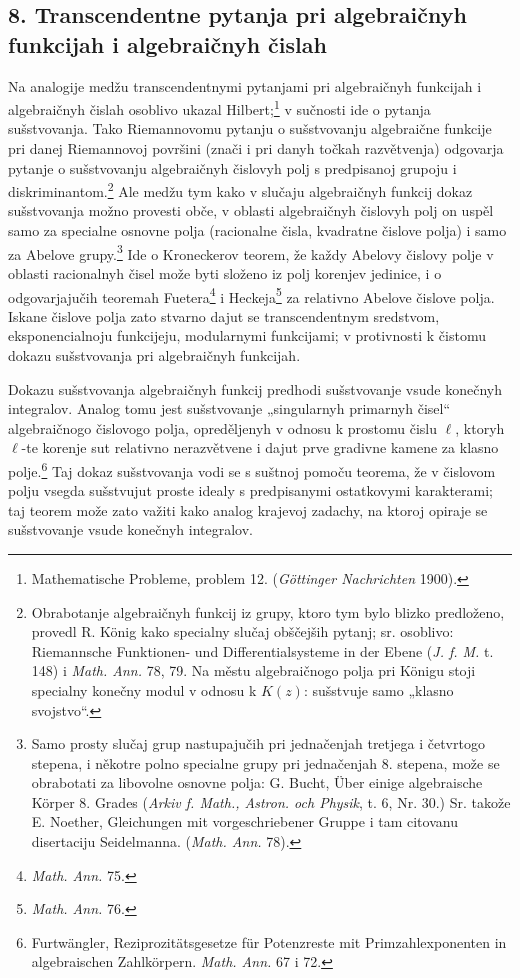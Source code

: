 \documentclass[11pt]{article}
\begin{document}
\subsection*{8. Transcendentne pytanja pri algebraičnyh funkcijah i algebraičnyh čislah}
Na analogije medžu transcendentnymi pytanjami pri algebraičnyh funkcijah i algebraičnyh čislah osoblivo ukazal Hilbert;\footnote{Mathematische Probleme, problem 12. (\emph{Göttinger Nachrichten} 1900).} v sučnosti ide o pytanja sušstvovanja. Tako Riemannovomu pytanju o sušstvovanju algebraične funkcije pri danej Riemannovoj površini (znači i pri danyh točkah razvětvenja) odgovarja pytanje o sušstvovanju algebraičnyh čislovyh polj s predpisanoj grupoju i diskriminantom.\footnote{Obrabotanje algebraičnyh funkcij iz grupy, ktoro tym bylo blizko predloženo, provedl R. König kako specialny slučaj obščejših pytanj; sr. osoblivo: Riemannsche Funktionen- und Differentialsysteme in der Ebene (\emph{J. f. M.} t. 148) i \emph{Math. Ann.} 78, 79. Na městu algebraičnogo polja pri Königu stoji specialny konečny modul v odnosu k \(K(z)\): sušstvuje samo „klasno svojstvo“.} Ale medžu tym kako v slučaju algebraičnyh funkcij dokaz sušstvovanja možno provesti obče, v oblasti algebraičnyh čislovyh polj on uspěl samo za specialne osnovne polja (racionalne čisla, kvadratne čislove polja) i samo za Abelove grupy.\footnote{Samo prosty slučaj grup nastupajučih pri jednačenjah tretjega i četvrtogo stepena, i někotre polno specialne grupy pri jednačenjah 8. stepena, može se obrabotati za libovolne osnovne polja: G. Bucht, Über einige algebraische Körper 8. Grades (\emph{Arkiv f. Math., Astron. och Physik}, t. 6, Nr. 30.) Sr. takože E. Noether, Gleichungen mit vorgeschriebener Gruppe i tam citovanu disertaciju Seidelmanna. (\emph{Math. Ann.} 78).} Ide o Kroneckerov teorem, že každy Abelovy čislovy polje v oblasti racionalnyh čisel može byti složeno iz polj korenjev jedinice, i o odgovarjajučih teoremah Fuetera\footnote{\emph{Math. Ann.} 75.} i Heckeja\footnote{\emph{Math. Ann.} 76.} za relativno Abelove čislove polja. Iskane čislove polja zato stvarno dajut se transcendentnym sredstvom, eksponencialnoju funkcijeju, modularnymi funkcijami; v protivnosti k čistomu dokazu sušstvovanja pri algebraičnyh funkcijah.

Dokazu sušstvovanja algebraičnyh funkcij predhodi sušstvovanje vsude konečnyh integralov. Analog tomu jest sušstvovanje „singularnyh primarnyh čisel“ algebraičnogo čislovogo polja, opreděljenyh v odnosu k prostomu čislu \(\ell\), ktoryh \(\ell\)-te korenje sut relativno nerazvětvene i dajut prve gradivne kamene za klasno polje.\footnote{Furtwängler, Reziprozitätsgesetze für Potenzreste mit Primzahlexponenten in algebraischen Zahlkörpern. \emph{Math. Ann.} 67 i 72.} Taj dokaz sušstvovanja vodi se s suštnoj pomoču teorema, že v čislovom polju vsegda sušstvujut proste idealy s predpisanymi ostatkovymi karakterami; taj teorem može zato važiti kako analog krajevoj zadachy, na ktoroj opiraje se sušstvovanje vsude konečnyh integralov.
\end{document}
